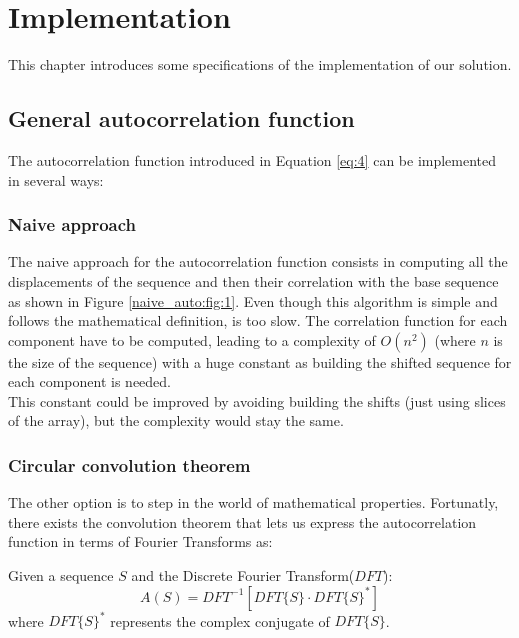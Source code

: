\chapter{Implementation}
  This chapter introduces some specifications of the implementation
  of our solution.\\


  \section{General autocorrelation function}
    The autocorrelation function introduced in Equation \eqref{eq:4} can be
    implemented in several ways:

      \subsection{Naive approach}
        The naive approach for the autocorrelation function consists in
        computing all the displacements of the sequence and then
        their correlation with the base sequence as shown in Figure
        \ref{naive_auto:fig:1}. Even though this algorithm is simple and
        follows the mathematical definition, is too slow. The correlation function
        for each component have to be computed, leading to a
        complexity of $O(n^{2})$ (where $n$ is the size of the sequence) with a
        huge constant as building the shifted sequence for each
        component is needed.\\

        This constant could be improved by avoiding building the shifts (just
        using slices of the array), but the complexity would stay the
        same.

      \subsection{Circular convolution theorem}
        The other option is to step in the world of mathematical properties.
        Fortunatly, there exists the convolution theorem\cite{golomb_ref} that
        lets us express the autocorrelation function in terms of Fourier
        Transforms as:
        \begin{theorem}
          Given a sequence $S$ and the Discrete Fourier Transform($DFT$):
          \begin{equation}
            A(S) = DFT^{-1}[DFT\{S\} · DFT\{S\}^{*}]
          \end{equation}
          where $DFT\{S\}^{*}$ represents the complex conjugate of $DFT\{S\}$.
        \end{theorem}

